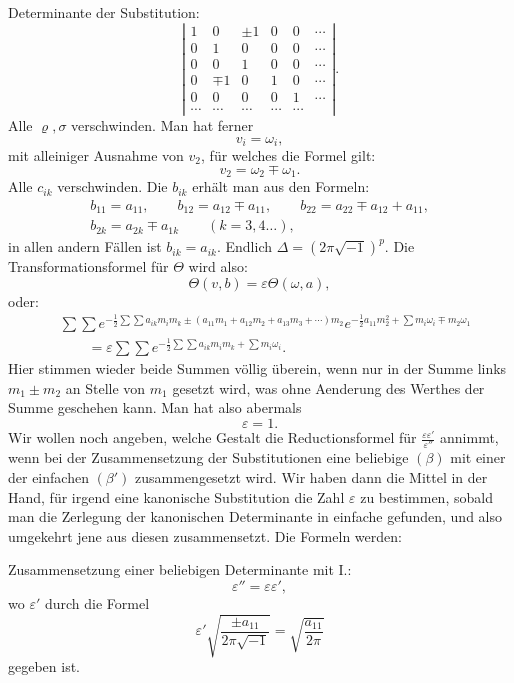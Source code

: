 \documentclass[10pt]{article}
\begin{document}
Determinante der Substitution:
\[
\left|\begin{array}{cccccc}
1&0&\pm1&0&0&\cdots\\
0&1&0&0&0&\cdots\\
0&0&1&0&0&\cdots\\
0&\mp1&0&1&0&\cdots\\
0&0&0&0&1&\cdots\\
\cdots&\cdots&\cdots&\cdots&\cdots&
\end{array}\right|.
\]
Alle \(\varrho,\sigma\) verschwinden. Man hat ferner
\[
v_i=\omega_i,
\]
mit alleiniger Ausnahme von \(v_2\), für welches die Formel gilt:
\[
v_2=\omega_2\mp\omega_1.
\]
Alle \(c_{ik}\) verschwinden. Die \(b_{ik}\) erhält man aus den Formeln:
\[
\begin{gathered}
b_{11}=a_{11},\qquad b_{12}=a_{12}\mp a_{11},\qquad b_{22}=a_{22}\mp a_{12}+a_{11},\\
b_{2k}=a_{2k}\mp a_{1k}\qquad(k=3,4\ldots),
\end{gathered}
\]
in allen andern Fällen ist \(b_{ik}=a_{ik}\). Endlich \(\Delta=(2\pi\sqrt{-1})^p\). Die Transformationsformel für \(\Theta\) wird also:
\[
\Theta(v,b)=\varepsilon\Theta(\omega,a),
\]
oder:
\[
\begin{aligned}
&\sum\sum e^{-\frac12\sum\sum a_{ik}m_im_k\pm(a_{11}m_1+a_{12}m_2+a_{13}m_3+\cdots)m_2}
 e^{-\frac12a_{11}m_2^2+\sum m_i\omega_i\mp m_2\omega_1}\\
&\qquad=\varepsilon\sum\sum e^{-\frac12\sum\sum a_{ik}m_im_k+\sum m_i\omega_i}.
\end{aligned}
\]
Hier stimmen wieder beide Summen völlig überein, wenn nur in der Summe links \(m_1\pm m_2\) an Stelle von \(m_1\) gesetzt wird, was ohne Aenderung des Werthes der Summe geschehen kann. Man hat also abermals
\[
\varepsilon=1.
\]
Wir wollen noch angeben, welche Gestalt die Reductionsformel für \(\frac{\varepsilon\varepsilon'}{\varepsilon''}\) annimmt, wenn bei der Zusammensetzung der Substitutionen eine beliebige \((\beta)\) mit einer der einfachen \((\beta')\) zusammengesetzt wird. Wir haben dann die Mittel in der Hand, für irgend eine kanonische Substitution die Zahl \(\varepsilon\) zu bestimmen, sobald man die Zerlegung der kanonischen Determinante in einfache gefunden, und also umgekehrt jene aus diesen zusammensetzt. Die Formeln werden:

Zusammensetzung einer beliebigen Determinante mit I.:
\[
\varepsilon''=\varepsilon\varepsilon',
\]
wo \(\varepsilon'\) durch die Formel
\[
\varepsilon'\sqrt{\frac{\pm a_{11}}{2\pi\sqrt{-1}}}=\sqrt{\frac{a_{11}}{2\pi}}
\]
gegeben ist.
\end{document}
